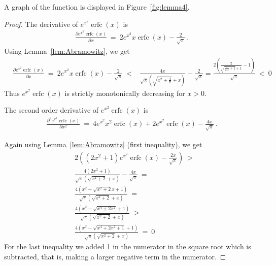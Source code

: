\documentclass{article}
\DeclareMathOperator{\erfc}{erfc}
\begin{document}
A graph of the function is displayed in Figure~\ref{fig:lemma4}.

\begin{proof}
The derivative of $e^{x^2} \erfc (x)$ is
\begin{align}
\frac{\partial e^{x^2} \erfc (x)}{\partial x} \ = \  
2 e^{x^2} x \erfc (x)-\frac{2}{\sqrt{\pi }} \ .
\end{align}
Using Lemma~\ref{lem:Abramowitz}, we get
\begin{align}
&\frac{\partial e^{x^2} \erfc (x)}{\partial x} \ = \ 
2 e^{x^2} x \erfc (x)-\frac{2}{\sqrt{\pi }}\ <  &\frac{4 x}{\sqrt{\pi } \left(\sqrt{x^2+\frac{4}{\pi
  }}+x\right)}-\frac{2}{\sqrt{\pi }}=\frac{2
  \left(\frac{2}{\sqrt{\frac{4}{\pi  x^2}+1}+1}-1\right)}{\sqrt{\pi }}
  \ < \ 0
\end{align}
Thus $e^{x^2} \erfc (x)$
is strictly monotonically decreasing for $x > 0$.

The second order derivative of $e^{x^2} \erfc (x)$ is
\begin{align}
\frac{\partial^2 e^{x^2} \erfc (x)}{\partial x^2} \ = \  
4 e^{x^2} x^2 \erfc (x)+2 e^{x^2} \erfc (x)-\frac{4 x}{\sqrt{\pi }} \ .
\end{align}

Again using Lemma~\ref{lem:Abramowitz} (first inequality), we get
\begin{align}
&2 \left(\left(2 x^2+1\right) e^{x^2} \erfc (x)-\frac{2
  x}{\sqrt{\pi }}\right)
\ > \\\nonumber
&\frac{4 \left(2 x^2+1\right)}{\sqrt{\pi } \left(\sqrt{x^2+2}+x\right)}-\frac{4 x}{\sqrt{\pi }}
\ = \\\nonumber
&\frac{4 \left(x^2-\sqrt{x^2+2} x+1\right)}{\sqrt{\pi } \left(\sqrt{x^2+2}+x\right)}
\ = \\\nonumber
&\frac{4 \left(x^2-\sqrt{x^4+2 x^2}+1\right)}{\sqrt{\pi } \left(\sqrt{x^2+2}+x\right)}
\ > \\\nonumber
&\frac{4 \left(x^2-\sqrt{x^4+2 x^2+1}+1\right)}{\sqrt{\pi }
  \left(\sqrt{x^2+2}+x\right)} \ = \ 0
\end{align}
For the last inequality we added 1 in the numerator in the square root
which is subtracted, that is, making a larger negative term in the
numerator. 
\end{proof}
\end{document}
